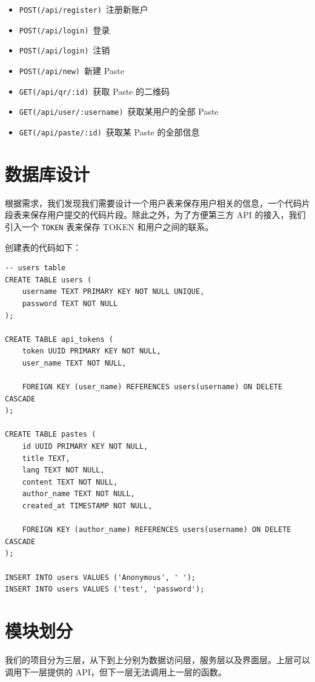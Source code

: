 \documentclass[ichigo,normal,cn]{elegantnote}
\newcommand{\code}[1]{\colorbox{light-gray}{\texttt{#1}}}
\begin{document}
\begin{itemize}
    \item \code{POST(/api/register)}\ 注册新账户
    \item \code{POST(/api/login)}\ 登录
    \item \code{POST(/api/login)}\ 注销
    \item \code{POST(/api/new)}\ 新建 Paste
    \item \code{GET(/api/qr/:id)}\ 获取 Paste 的二维码
    \item \code{GET(/api/user/:username)}\ 获取某用户的全部 Paste
    \item \code{GET(/api/paste/:id)}\ 获取某 Paste 的全部信息
\end{itemize}

\section{数据库设计}

根据需求，我们发现我们需要设计一个用户表来保存用户相关的信息，一个代码片段表来保存用户提交的代码片段。除此之外，为了方便第三方 API 的接入，我们引入一个 \code{TOKEN} 表来保存 TOKEN 和用户之间的联系。

创建表的代码如下：

\begin{lstlisting}
-- users table
CREATE TABLE users (
    username TEXT PRIMARY KEY NOT NULL UNIQUE,
    password TEXT NOT NULL
);

CREATE TABLE api_tokens (
    token UUID PRIMARY KEY NOT NULL,
    user_name TEXT NOT NULL,

    FOREIGN KEY (user_name) REFERENCES users(username) ON DELETE CASCADE
);

CREATE TABLE pastes (
    id UUID PRIMARY KEY NOT NULL,
    title TEXT,
    lang TEXT NOT NULL,
    content TEXT NOT NULL,
    author_name TEXT NOT NULL,
    created_at TIMESTAMP NOT NULL,

    FOREIGN KEY (author_name) REFERENCES users(username) ON DELETE CASCADE
);

INSERT INTO users VALUES ('Anonymous', ' ');
INSERT INTO users VALUES ('test', 'password');
\end{lstlisting}

\section{模块划分}
我们的项目分为三层，从下到上分别为数据访问层，服务层以及界面层。上层可以调用下一层提供的 API，但下一层无法调用上一层的函数。
\end{document}
